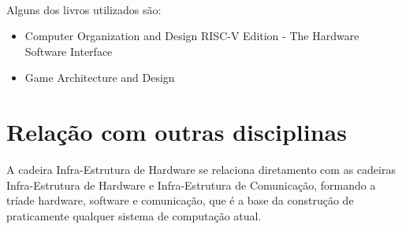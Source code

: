 \documentclass[10pt]{article}
\begin{document}
\paragraph{} Alguns dos livros utilizados são:
\begin{itemize}
    \item Computer Organization and Design RISC-V Edition - The Hardware Software Interface \cite {david2017}
    \item Game Architecture and Design \cite {william2009}
\end{itemize}

\section{Relação com outras disciplinas}
A cadeira Infra-Estrutura de Hardware se relaciona diretamento com as cadeiras Infra-Estrutura de Hardware e Infra-Estrutura de Comunicação, formando a tríade hardware, software e comunicação, que é a base da construção de praticamente qualquer sistema de computação atual.



\nocite{*}
\end{document}
